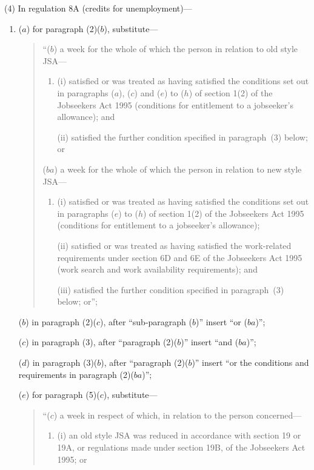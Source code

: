 \documentclass[12pt,a4paper]{article}
\begin{document}
(4) In regulation 8A (credits for unemployment)—
\begin{enumerate}\item[]
($a$) for paragraph (2)($b$), substitute—
\begin{quotation}
“($b$) a week for the whole of which the person in relation to old style JSA—
\begin{enumerate}\item[]
(i) satisfied or was treated as having satisfied the conditions set out in paragraphs ($a$), ($c$)  and ($e$)  to ($h$)  of section 1(2) of the Jobseekers Act 1995 (conditions for entitlement to a jobseeker’s allowance); and

\begin{sloppypar}
(ii) satisfied the further condition specified in paragraph~(3) below; or
\end{sloppypar}
\end{enumerate}

($ba$) a week for the whole of which the person in relation to new style JSA—
\begin{enumerate}\item[]
(i) satisfied or was treated as having satisfied the conditions set out in paragraphs ($e$)  to ($h$)  of section 1(2) of the Jobseekers Act 1995 (conditions for entitlement to a jobseeker’s allowance);

(ii) satisfied or was treated as having satisfied the work-related requirements under section 6D and 6E of the Jobseekers Act 1995 (work search and work availability requirements); and

\begin{sloppypar}
(iii) satisfied the further condition specified in paragraph~(3) below; or”;
\end{sloppypar}
\end{enumerate}
\end{quotation}

($b$) in paragraph (2)($c$), after “sub-paragraph ($b$)” insert “or ($ba$)”;

($c$) in paragraph (3), after “paragraph (2)($b$)” insert “and ($ba$)”;

($d$) in paragraph (3)($b$), after “paragraph (2)($b$)” insert “or the conditions and requirements in paragraph (2)($ba$)”;

($e$) for paragraph (5)($c$), substitute—
\begin{quotation}
“($c$) a week in respect of which, in relation to the person concerned—
\begin{enumerate}\item[]
(i) an old style JSA was reduced in accordance with section 19 or 19A, or regulations made under section 19B, of the Jobseekers Act 1995; or


\end{enumerate}
\end{quotation}
\end{enumerate}
\end{document}
